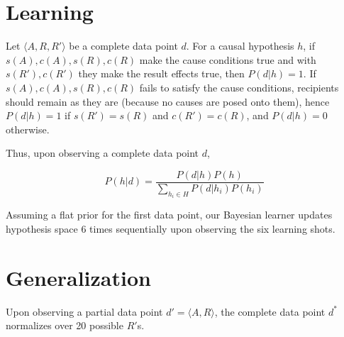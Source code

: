 \documentclass[11pt]{article}
\begin{document}
\section*{Learning}

Let $\langle A, R, R' \rangle$ be a complete data point $d$. 
For a causal hypothesis $h$,
if $s(A), c(A), s(R), c(R)$ make the cause conditions true and 
with $s(R'), c(R')$ they make the result effects true, 
then $P(d|h) = 1$.
If $s(A), c(A), s(R), c(R)$ fails to satisfy the cause conditions,
recipients should remain as they are (because no causes are posed onto them),
hence $P(d|h) = 1$ if $s(R') = s(R)$ and $c(R') = c(R)$, 
and $P(d|h) = 0$ otherwise.

Thus, upon observing a complete data point $d$, 

\[P(h|d) = \frac{P(d|h)P(h)}{\sum_{h_i \in H}P(d|h_i)P(h_i)}\]

Assuming a flat prior for the first data point,
our Bayesian learner updates hypothesis space 6 times sequentially upon 
observing the six learning shots.

\section*{Generalization}

Upon observing a partial data point $d' = \langle A, R \rangle$,
the complete data point $d^*$ normalizes over 20 possible $R'$s.



















\end{document}
